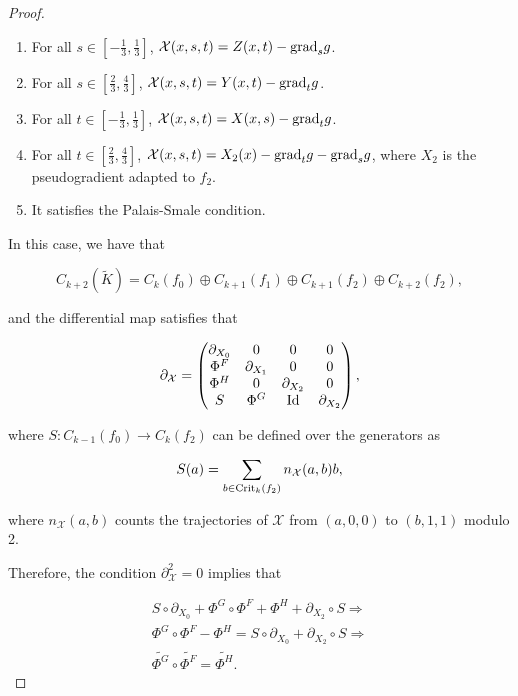 \begin{proof}
\begin{enumerate}
	\item For all $s \in \left[-\frac13,\frac13\right]$, $\mathcal{X}(x,s,t) = Z(x,t) - \text{grad}_sg$.
	\item For all $s \in \left[\frac23,\frac43\right]$, $\mathcal{X}(x,s,t) = Y(x,t) - \text{grad}_tg$.
	\item For all $t \in \left[-\frac13,\frac13\right]$, $\mathcal{X}(x,s,t) = X(x,s) - \text{grad}_tg$.
	\item For all $t \in \left[\frac23,\frac43\right]$, $\mathcal{X}(x,s,t) = X_2(x) - \text{grad}_tg - \text{grad}_sg$, where $X_2$ is the pseudogradient adapted to $f_2$.
	\item It satisfies the Palais-Smale condition.
\end{enumerate}

In this case, we have that

\begin{displaymath}
C_{k+2}(\tilde{K}) = C_k(f_0) \oplus C_{k+1}(f_1) \oplus C_{k+1}(f_2) \oplus C_{k+2}(f_2) ,
\end{displaymath}

and the differential map satisfies that

\begin{displaymath}
\partial_{\mathcal{X}} = \begin{pmatrix} \partial_{X_0} & 0 & 0 & 0 \\ \Phi^F & \partial_{X_1} & 0 & 0 \\ \Phi^H & 0 & \partial_{X_2} & 0 \\ S & \Phi^G & \text{Id} & \partial_{X_2} \end{pmatrix} ,
\end{displaymath}

where $S : C_{k-1}(f_0) \longrightarrow C_k(f_2)$ can be defined over the generators as

\begin{displaymath}
S(a) = \sum_{b \in \text{Crit}_k(f_2)} n_{\mathcal{X}}(a,b) b ,
\end{displaymath}

where $n_{\mathcal{X}}(a,b)$ counts the trajectories of $\mathcal{X}$ from $(a,0,0)$ to $(b,1,1)$ modulo 2.

Therefore, the condition $\partial_{\mathcal{X}}^2 = 0$ implies that

\begin{eqnarray*}
S \circ \partial_{X_0} + \Phi^G \circ \Phi^F + \Phi^H + \partial_{X_2} \circ S \Rightarrow \\
\Phi^G \circ \Phi^F - \Phi^H = S \circ \partial_{X_0} + \partial_{X_2} \circ S \Rightarrow \\
\widetilde{\Phi^G} \circ \widetilde{\Phi^F} = \widetilde{\Phi^H} .
\end{eqnarray*}


\end{proof}
